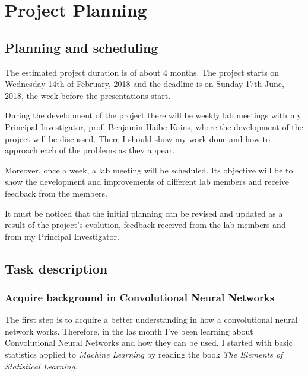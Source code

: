 

\section{Project Planning}

\subsection{Planning and scheduling}

The estimated project duration is of about 4 months. The project starts on Wednesday 14th of 
February, 2018 and the deadline is on Sunday 17th June, 2018, the week before the 
presentations start.

During the development of the project there will be weekly lab meetings with my Principal
Investigator, prof. Benjamin Haibe-Kains, where the development of the project will be 
discussed. There I should show my work done and how to approach each of the problems as
they appear.

Moreover, once a week, a lab meeting will be scheduled. Its objective will be to show
the development and improvements of different lab members and receive feedback from the 
members.

It must be noticed that the initial planning can be revised and updated as a result of the 
project's evolution, feedback received from the lab members and from my Principal Investigator. 

\subsection{Task description}

\subsubsection{Acquire background in Convolutional Neural Networks}

The first step is to acquire a better understanding in how a convolutional neural network works.
Therefore, in the las month I've been learning about Convolutional Neural Networks and how they
can be used. 
I started with basic statistics applied to \emph{Machine Learning} by reading the book 
\emph{The Elements of Statistical Learning}.~\cite{ElementsStatisticalLearning}

